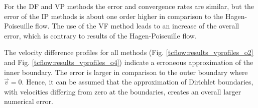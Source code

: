 For the DF and VP methods the error and convergence rates are similar,
but the error of the IP methods is about one order higher in comparison to the Hagen-Poiseuille flow.
The use of the VF method leads to an increase of the overall error, which is contrary to results of the Hagen-Poiseuille flow.

The velocity difference profiles for all methods (Fig. \ref{tcflow:results_vprofiles_o2} and Fig. \ref{tcflow:results_vprofiles_o4})
indicate a erroneous approximation of the inner boundary.
The error is larger in comparison to the outer boundary where $\vec{v} = 0$.
Hence, it can be assumed that the approximation of Dirichlet boundaries, with velocities differing from zero at the boundaries,
creates an overall larger numerical error.






%
%

